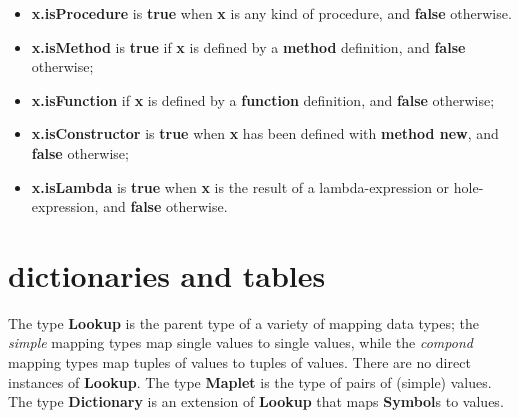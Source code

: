 \documentclass{report}
\begin{document}
\begin{itemize}\item {\bf x.isProcedure} is {\bf true} when {\bf x} is any kind of procedure, and {\bf false}
otherwise.

\item {\bf x.isMethod} is {\bf true} if {\bf x} is defined by a {\bf method} definition, and {\bf false}
otherwise;

\item {\bf x.isFunction} if {\bf x} is defined by a {\bf function} definition, and {\bf false}
otherwise;

\item {\bf x.isConstructor} is {\bf true} when {\bf x} has been defined with {\bf method new}, and
{\bf false} otherwise;

\item {\bf x.isLambda} is {\bf true} when {\bf x} is the result of a lambda-expression or
hole-expression, and {\bf false} otherwise.

\end{itemize}\section{dictionaries and tables}


The type {\bf Lookup} is the parent type of a variety of mapping data types; the
{\em simple} mapping types map single values to single values, while the {\em compond}
mapping types map tuples of values to tuples of values. There are no direct
instances of {\bf Lookup}. The type {\bf Maplet} is the type of pairs of (simple)
values. The type {\bf Dictionary} is an extension of {\bf Lookup} that maps {\bf Symbol}s
to values.
\end{document}
